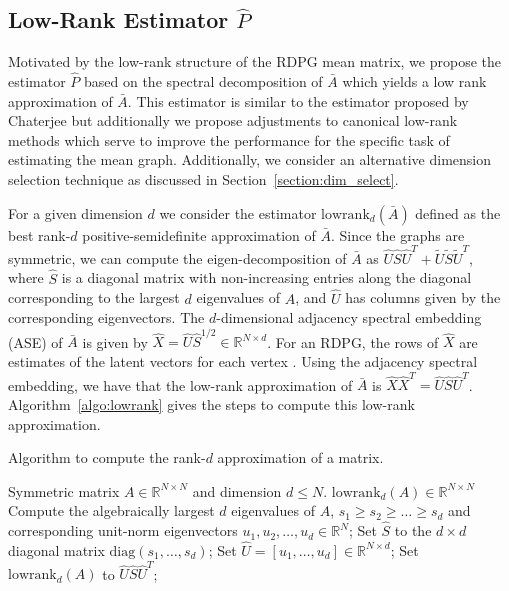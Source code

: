 \documentclass[10pt,letterpaper]{article}
\renewcommand{\Re}{\mathbb{R}}
\renewcommand{\hat}{\widehat}
\begin{document}
\subsection[Low-Rank Estimator]{Low-Rank Estimator $\hat{P}$}
\label{sec:phat}

Motivated by the low-rank structure of the RDPG mean matrix, we propose the estimator $\hat{P}$ based on the spectral decomposition of $\bar{A}$ which yields a low rank approximation of $\bar{A}$.
This estimator is similar to the estimator proposed by Chaterjee \cite{chatterjee2015matrix} but additionally
we propose adjustments to canonical low-rank methods which serve to improve the performance for the specific task of estimating the mean graph. 
Additionally, we consider an alternative dimension selection technique as discussed in Section~\ref{section:dim_select}.

For a given dimension $d$ we consider the estimator $\mathrm{lowrank}_d(\bar{A})$ defined as the best rank-$d$ positive-semidefinite approximation of $\bar{A}$.
Since the graphs are symmetric, we can compute the eigen-decomposition of $\bar{A}$ as $\hat{U} \hat{S} \hat{U}^T + \tilde{U}\tilde{S}\tilde{U}^T$, where $\hat{S}$ is a diagonal matrix with non-increasing entries along the diagonal corresponding to the largest $d$ eigenvalues of $A$, and $\hat{U}$ has columns given by the corresponding eigenvectors.
The $d$-dimensional adjacency spectral embedding (ASE) of $\bar{A}$ is given by $\hat{X}=\hat{U} \hat{S}^{1/2}\in \Re^{N \times d}$.
For an RDPG, the rows of $\hat{X}$ are estimates of the latent vectors for each vertex \cite{sussman2014consistent}.
Using the adjacency spectral embedding, we have that the low-rank approximation of $\bar{A}$ is $\hat{X} \hat{X}^T=\hat{U}\hat{S}\hat{U}^T$.
Algorithm~\ref{algo:lowrank} gives the steps to compute this low-rank approximation.

\begin{algorithm}[H]
\caption{Algorithm to compute the rank-$d$ approximation of a matrix.}
\label{algo:lowrank}
\begin{algorithmic}[1]
\REQUIRE Symmetric matrix $A\in \Re^{N\times N}$ and dimension $d\leq N$.
\ENSURE $\mathrm{lowrank}_d(A)\in \Re^{N\times N}$
\STATE Compute the algebraically largest $d$ eigenvalues of $A$, $s_1\geq s_2\geq \dotsc\geq s_d$ and corresponding unit-norm eigenvectors $u_1,u_2,\dotsc,u_d\in \Re^N$;
\STATE Set $\hat{S}$ to the $d\times d$ diagonal matrix $\mathrm{diag}(s_1,\dotsc,s_d)$;
\STATE Set $\hat{U} = [u_1,\dotsc,u_d]\in \Re^{N\times d}$;
\STATE Set $\mathrm{lowrank}_d(A)$ to $\hat{U}\hat{S}\hat{U}^T$;
\end{algorithmic}
\end{algorithm}
\end{document}
